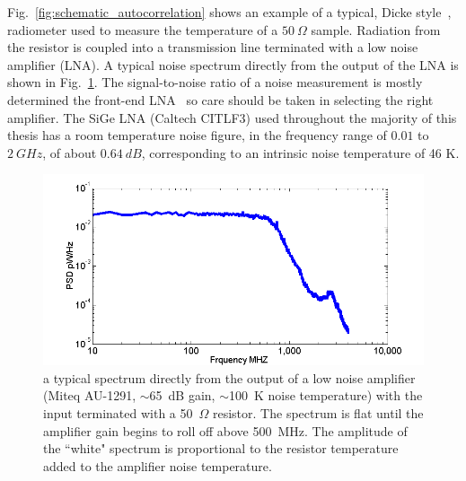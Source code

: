 Fig.~\ref{fig:schematic_autocorrelation} shows an example of a typical, Dicke style~\cite{dicke_measurement_1946}, radiometer used to measure the temperature of a $50~\Omega$ sample. Radiation from the resistor is coupled into a transmission line terminated with a low noise amplifier (LNA). A typical noise spectrum directly from the output of the LNA is shown in Fig.~\ref{fig:Miteq_spec}. The signal-to-noise ratio of a noise measurement is mostly determined the front-end LNA~\cite{pozar_microwave_2011} so care should be taken in selecting the right amplifier. The SiGe LNA (Caltech CITLF3) used throughout the majority of this thesis has a room temperature noise figure, in the frequency range of $0.01$ to $2~GHz$, of about $0.64~dB$, corresponding to an intrinsic noise temperature of 46 K.
\begin{figure}
\includegraphics[width=\textwidth]{figures/Johnson_noise_thermometry/Miteq_spec.png}
\caption{a typical spectrum directly from the output of a low noise amplifier (Miteq AU-1291, $\sim$65~dB gain, $\sim$100~K noise temperature) with the input terminated with a 50~$\Omega$ resistor. The spectrum is flat until the amplifier gain begins to roll off above 500~MHz. The amplitude of the ``white" spectrum is proportional to the resistor temperature added to the amplifier noise temperature.}
\label{fig:Miteq_spec}
\end{figure}

